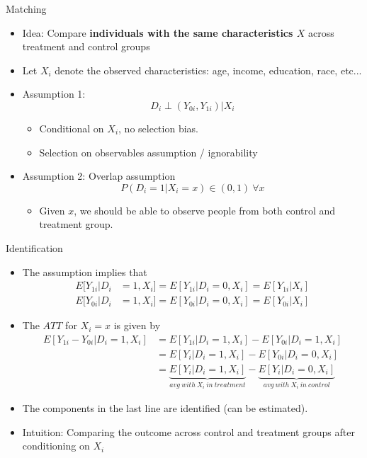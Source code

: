 \documentclass[
  ignorenonframetext,
]{beamer}
\providecommand{\tightlist}{%
  \setlength{\itemsep}{0pt}\setlength{\parskip}{0pt}}
\begin{document}
\begin{frame}{Matching}
\protect\hypertarget{matching-1}{}
\begin{itemize}
\item
  Idea: Compare \textbf{individuals with the same characteristics \(X\)}
  across treatment and control groups
\item
  Let \(X_{i}\) denote the observed characteristics: age, income,
  education, race, etc...
\item
  Assumption 1: \[D_{i}\perp(Y_{0i},Y_{1i})\left|X_{i}\right.\]

  \begin{itemize}
  \item
    Conditional on \(X_{i}\), no selection bias.
  \item
    Selection on observables assumption / ignorability
  \end{itemize}
\item
  Assumption 2: Overlap assumption
  \[P(D_{i}=1|X_{i}=x)\in(0,1)\ \forall x\]

  \begin{itemize}
  \tightlist
  \item
    Given \(x\), we should be able to observe people from both control
    and treatment group.
  \end{itemize}
\end{itemize}
\end{frame}

\begin{frame}{Identification}
\protect\hypertarget{identification}{}
\begin{itemize}
\item
  The assumption implies that \[\begin{aligned}
  E[Y_{1i}|D_{i} & =1,X_{i}]=E[Y_{1i}|D_{i}=0,X_{i}]=E[Y_{1i}|X_{i}]\\
  E[Y_{0i}|D_{i} & =1,X_{i}]=E[Y_{0i}|D_{i}=0,X_{i}]=E[Y_{0i}|X_{i}]\end{aligned}\]
\item
  The \(ATT\) for \(X_{i}=x\) is given by \[\begin{aligned}
  E[Y_{1i}-Y_{0i}|D_{i}=1,X_{i}] & =E[Y_{1i}|D_{i}=1,X_{i}]-E[Y_{0i}|D_{i}=1,X_{i}]\\
   & =E[Y_{i}|D_{i}=1,X_{i}]-E[Y_{0i}|D_{i}=0,X_{i}]\\
   & =\underbrace{E[Y_{i}|D_{i}=1,X_{i}]}_{avg\ with\ X_{i}\ in\ treatment}-\underbrace{E[Y_{i}|D_{i}=0,X_{i}]}_{avg\ with\ X_{i}\ in\ control}\end{aligned}\]
\item
  The components in the last line are identified (can be estimated).
\item
  Intuition: Comparing the outcome across control and treatment groups
  after conditioning on \(X_{i}\)
\end{itemize}
\end{frame}
\end{document}
